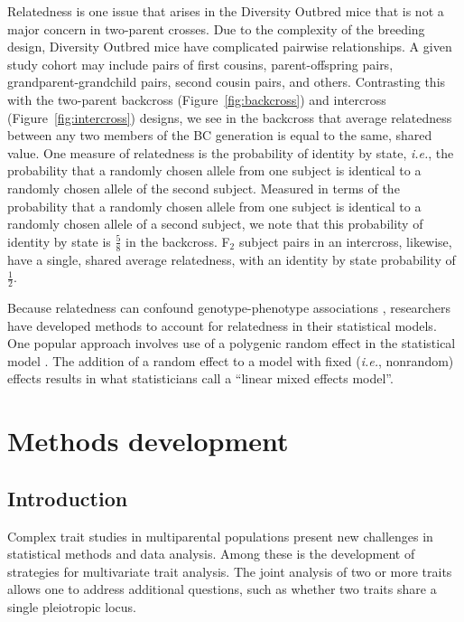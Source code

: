 \documentclass[oneside]{book}\usepackage[]{graphicx}\usepackage[]{color}
\begin{document}
Relatedness is one issue that arises in the Diversity Outbred mice that is not a major concern in 
two-parent crosses. Due to the complexity of the breeding design, Diversity Outbred mice
have 
complicated pairwise relationships. A given study cohort may include pairs of first
cousins, parent-offspring pairs, grandparent-grandchild pairs, second cousin pairs, and others.
Contrasting this with the two-parent backcross (Figure~\ref{fig:backcross}) and
intercross (Figure~\ref{fig:intercross}) designs, we see in the backcross that
average relatedness between any two members of the BC generation is equal to the same, shared value.
One measure of relatedness is the probability of identity by state, \emph{i.e.}, the
probability that a randomly chosen allele from one subject is identical to a randomly chosen
allele of the second subject. Measured in terms of the probability that a randomly chosen allele
from one subject is identical to a randomly chosen allele of a second subject, we note that
this probability of identity by state is $\frac{5}{8}$ in the backcross. F$_2$ subject pairs in an intercross, likewise, have a single, shared average relatedness, with an identity by state probability of $\frac{1}{2}$.

Because relatedness can confound genotype-phenotype associations \citep{yang2014advantages}, researchers have developed methods to account for relatedness in their statistical models. One popular approach involves use of a polygenic random effect in the statistical model \citep{kang2008efficient}. The addition of a random effect to a model with fixed (\emph{i.e.}, nonrandom) effects results in what statisticians call a ``linear mixed effects model''. 








\chapter{Methods development}


\section{Introduction}

Complex trait studies in multiparental populations present new
challenges in statistical methods and data analysis. Among these is
the development of strategies for multivariate trait analysis. The
joint analysis of two or more traits allows one to address additional
questions, such as whether two traits share a single pleiotropic
locus.
\end{document}
